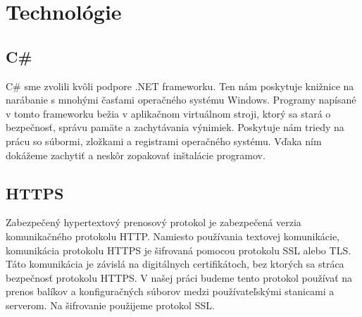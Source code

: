 \chapter{Technológie}

\section{C\#}
C\# sme zvolili kvôli podpore .NET frameworku. Ten nám poskytuje knižnice na narábanie s mnohými časťami operačného systému Windows. Programy napísané v tomto frameworku bežia v aplikačnom virtuálnom stroji, ktorý sa stará o bezpečnosť, správu pamäte a zachytávania výnimiek. Poskytuje nám triedy na prácu so súbormi, zložkami a registrami operačného systému. Vďaka ním dokážeme zachytiť a neskôr zopakovať inštalácie programov.

\section{HTTPS}
Zabezpečený hypertextový prenosový protokol je zabezpečená verzia komunikačného protokolu HTTP. Namiesto používania textovej komunikácie, komunikácia protokolu HTTPS je šifrovaná pomocou protokolu SSL alebo TLS. Táto komunikácia je závislá na digitálnych certifikátoch, bez ktorých sa stráca bezpečnosť protokolu HTTPS. V našej práci budeme tento protokol používať na prenos balíkov a konfiguračných súborov medzi používateľskými stanicami a serverom. Na šifrovanie použijeme protokol SSL.